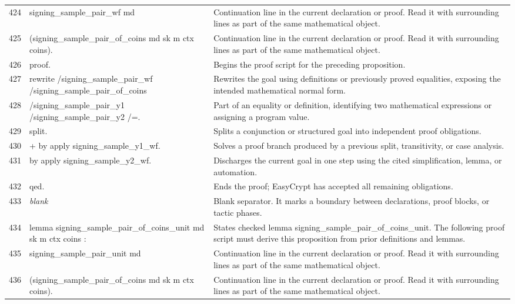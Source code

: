 \documentclass[10pt]{article}
\begin{document}
\begin{longtable}{r L{0.53\textwidth} L{0.37\textwidth}}
424 & {\ttfamily\scriptsize   signing\_sample\_pair\_wf md} & Continuation line in the current declaration or proof.  Read it with surrounding lines as part of the same mathematical object. \\
425 & {\ttfamily\scriptsize     (signing\_sample\_pair\_of\_coins md sk m ctx coins).} & Continuation line in the current declaration or proof.  Read it with surrounding lines as part of the same mathematical object. \\
426 & {\ttfamily\scriptsize proof.} & Begins the proof script for the preceding proposition. \\
427 & {\ttfamily\scriptsize rewrite /signing\_sample\_pair\_wf /signing\_sample\_pair\_of\_coins} & Rewrites the goal using definitions or previously proved equalities, exposing the intended mathematical normal form. \\
428 & {\ttfamily\scriptsize         /signing\_sample\_pair\_y1 /signing\_sample\_pair\_y2 /=.} & Part of an equality or definition, identifying two mathematical expressions or assigning a program value. \\
429 & {\ttfamily\scriptsize split.} & Splits a conjunction or structured goal into independent proof obligations. \\
430 & {\ttfamily\scriptsize + by apply signing\_sample\_y1\_wf.} & Solves a proof branch produced by a previous split, transitivity, or case analysis. \\
431 & {\ttfamily\scriptsize by apply signing\_sample\_y2\_wf.} & Discharges the current goal in one step using the cited simplification, lemma, or automation. \\
432 & {\ttfamily\scriptsize qed.} & Ends the proof; EasyCrypt has accepted all remaining obligations. \\
433 & {\ttfamily\scriptsize \emph{blank}} & Blank separator.  It marks a boundary between declarations, proof blocks, or tactic phases. \\
434 & {\ttfamily\scriptsize lemma signing\_sample\_pair\_of\_coins\_unit md sk m ctx coins :} & States checked lemma signing\_sample\_pair\_of\_coins\_unit.  The following proof script must derive this proposition from prior definitions and lemmas. \\
435 & {\ttfamily\scriptsize   signing\_sample\_pair\_unit md} & Continuation line in the current declaration or proof.  Read it with surrounding lines as part of the same mathematical object. \\
436 & {\ttfamily\scriptsize     (signing\_sample\_pair\_of\_coins md sk m ctx coins).} & Continuation line in the current declaration or proof.  Read it with surrounding lines as part of the same mathematical object. \\

\end{longtable}
\end{document}
